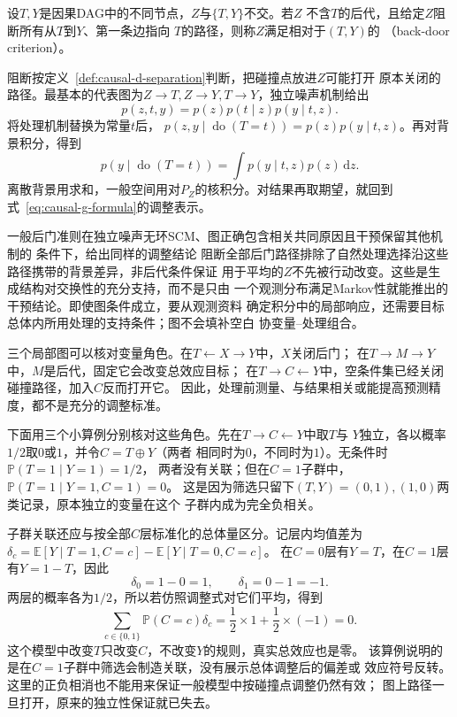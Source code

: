\begin{definition}
  \label{def:causal-backdoor-criterion}
  设\(T,Y\)是因果DAG中的不同节点，\(Z\)与\(\{T,Y\}\)不交。若\(Z\)
  不含\(T\)的后代，且给定\(Z\)阻断所有从\(T\)到\(Y\)、第一条边指向
  \(T\)的路径，则称\(Z\)满足相对于\((T,Y)\)的
  （back-door criterion）。
\end{definition}

阻断按定义~\ref{def:causal-d-separation}判断，把碰撞点放进\(Z\)可能打开
原本关闭的路径。最基本的代表图为\(Z\to T,Z\to Y,T\to Y\)，独立噪声机制给出
\[
  p(z,t,y)=p(z)p(t\mid z)p(y\mid t,z).
\]
将处理机制替换为常量\(t\)后，
\(p(z,y\mid\operatorname{do}(T=t))=p(z)p(y\mid t,z)\)。再对背景积分，得到
\begin{equation}
  p(y\mid\operatorname{do}(T=t))
  =
  \int p(y\mid t,z)p(z)\,\mathrm dz.
  \label{eq:causal-backdoor-adjustment}
\end{equation}
离散背景用求和，一般空间用对\(P_Z\)的核积分。对结果再取期望，就回到
式~\eqref{eq:causal-g-formula}的调整表示。

一般后门准则在独立噪声无环SCM、图正确包含相关共同原因且干预保留其他机制的
条件下，给出同样的调整结论
阻断全部后门路径排除了自然处理选择沿这些路径携带的背景差异，非后代条件保证
用于平均的\(Z\)不先被行动改变。这些是生成结构对交换性的充分支持，而不是只由
一个观测分布满足Markov性就能推出的干预结论。即使图条件成立，要从观测资料
确定积分中的局部响应，还需要目标总体内所用处理的支持条件；图不会填补空白
协变量--处理组合。

三个局部图可以核对变量角色。在\(T\leftarrow X\to Y\)中，\(X\)关闭后门；
在\(T\to M\to Y\)中，\(M\)是后代，固定它会改变总效应目标；
在\(T\to C\leftarrow Y\)中，空条件集已经关闭碰撞路径，加入\(C\)反而打开它。
因此，处理前测量、与结果相关或能提高预测精度，都不是充分的调整标准。

下面用三个小算例分别核对这些角色。先在\(T\to C\leftarrow Y\)中取\(T\)与
\(Y\)独立，各以概率\(1/2\)取\(0\)或\(1\)，并令\(C=T\oplus Y\)（两者
相同时为\(0\)，不同时为\(1\)）。无条件时\(\mathbb P(T=1\mid Y=1)=1/2\)，
两者没有关联；但在\(C=1\)子群中，\(\mathbb P(T=1\mid Y=1,C=1)=0\)。
这是因为筛选只留下\((T,Y)=(0,1),(1,0)\)两类记录，原本独立的变量在这个
子群内成为完全负相关。

子群关联还应与按全部\(C\)层标准化的总体量区分。记层内均值差为
\(\delta_c=\mathbb E[Y\mid T=1,C=c]-\mathbb E[Y\mid T=0,C=c]\)。
在\(C=0\)层有\(Y=T\)，在\(C=1\)层有\(Y=1-T\)，因此
\[
  \delta_0=1-0=1,\qquad \delta_1=0-1=-1.
\]
两层的概率各为\(1/2\)，所以若仿照调整式对它们平均，得到
\[
  \sum_{c\in\{0,1\}}\mathbb P(C=c)\delta_c
  =\frac12\times1+\frac12\times(-1)=0.
\]
这个模型中改变\(T\)只改变\(C\)，不改变\(Y\)的规则，真实总效应也是零。
该算例说明的是在\(C=1\)子群中筛选会制造关联，没有展示总体调整后的偏差或
效应符号反转。这里的正负相消也不能用来保证一般模型中按碰撞点调整仍然有效；
图上路径一旦打开，原来的独立性保证就已失去。

